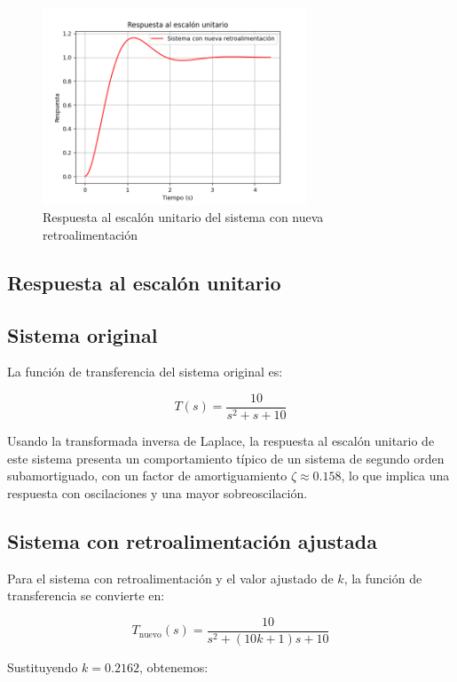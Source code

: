 \documentclass[10pt]{article}
\theoremstyle{definition}
\theoremstyle{remark}
\theoremstyle{definition}
\numberwithin{equation}{prob}
\begin{document}
\begin{figure}[h]
	\centering
	\includegraphics[width=0.7\textwidth]{./figures/Figura 5 ejercicio 5.png}
	\caption{Respuesta al escalón unitario del sistema con nueva retroalimentación}
\end{figure}

\newpage

\subsection{Respuesta al escalón unitario}

\subsection*{Sistema original}

La función de transferencia del sistema original es:

\[
T(s) = \frac{10}{s^2 + s + 10}
\]

Usando la transformada inversa de Laplace, la respuesta al escalón unitario de este sistema presenta un comportamiento típico de un sistema de segundo orden subamortiguado, con un factor de amortiguamiento \(\zeta \approx 0.158\), lo que implica una respuesta con oscilaciones y una mayor sobreoscilación.

\subsection*{Sistema con retroalimentación ajustada}

Para el sistema con retroalimentación y el valor ajustado de \( k \), la función de transferencia se convierte en:

\[
T_{\text{nuevo}}(s) = \frac{10}{s^2 + (10k + 1)s + 10}
\]

Sustituyendo \( k = 0.2162 \), obtenemos:
\end{document}
